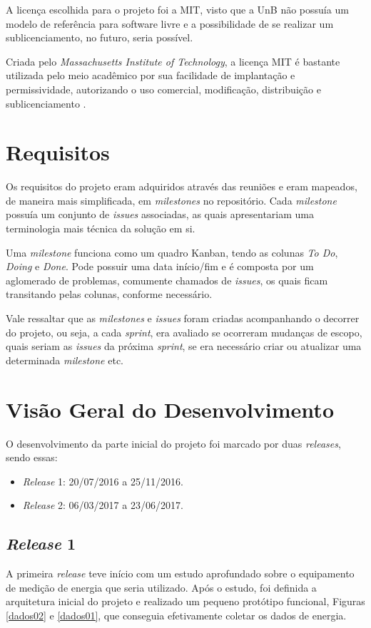 A licença escolhida para o projeto foi a MIT, visto que a UnB não possuía um modelo de referência para software livre e a possibilidade de se realizar um sublicenciamento, no futuro, seria possível.

Criada pelo \textit{Massachusetts Institute of Technology}, a licença MIT é bastante utilizada pelo meio acadêmico por sua facilidade de implantação e permissividade, autorizando o uso comercial, modificação, distribuição e sublicenciamento \cite{mit_license}.

\section{Requisitos}
Os requisitos do projeto eram adquiridos através das reuniões e eram mapeados, de maneira mais simplificada, em \textit{milestones} \cite{gitlab} no repositório. Cada \textit{milestone} possuía um conjunto de \textit{issues} associadas, as quais apresentariam uma terminologia mais técnica da solução em si.

Uma \textit{milestone} funciona como um quadro Kanban, tendo as colunas \textit{To Do}, \textit{Doing} e \textit{Done}. Pode possuir uma data início/fim e é composta por um aglomerado de problemas, comumente chamados de \textit{issues}, os quais ficam transitando pelas colunas, conforme necessário.

Vale ressaltar que as \textit{milestones} e \textit{issues} foram criadas acompanhando o decorrer do projeto, ou seja, a cada \textit{sprint}, era avaliado se ocorreram mudanças de escopo, quais seriam as \textit{issues} da próxima \textit{sprint}, se era necessário criar ou atualizar uma determinada \textit{milestone} etc.

\section{Visão Geral do Desenvolvimento}
O desenvolvimento da parte inicial do projeto foi marcado por duas \textit{releases}, sendo essas:

\begin{itemize}
    \item \textit{Release} 1: 20/07/2016 a 25/11/2016.
    \item \textit{Release} 2: 06/03/2017 a 23/06/2017.
\end{itemize}

\subsection{\textit{Release} 1}
A primeira \textit{release} teve início com um estudo aprofundado sobre o equipamento de medição de energia que seria utilizado. Após o estudo, foi definida a arquitetura inicial do projeto e realizado um pequeno protótipo funcional, Figuras \ref{dados02} e \ref{dados01}, que conseguia efetivamente coletar os dados de energia.

